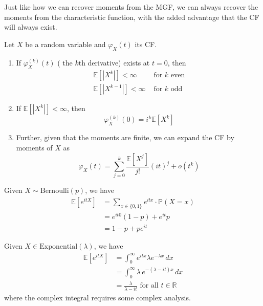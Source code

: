     Just like how we can recover moments from the MGF, we can always recover the moments from the characteristic function, with the added advantage that the CF will always exist. 

    \begin{theorem}
      Let $X$ be a random variable and $\varphi_X (t)$ its CF. 
      \begin{enumerate}
        \item If $\varphi_X^{(k)} (t)$ ( the $k$th derivative) exists at $t = 0$, then 
        \begin{align*}
          \mathbb{E}[|X^k|] < \infty & \text{ for } k \text{ even} \\
          \mathbb{E}[|X^{k-1}|] < \infty & \text{ for } k \text{ odd}
        \end{align*}
        
        \item If $\mathbb{E}[|X^k|] < \infty$, then 
        \begin{equation}
          \varphi_X^{(k)} (0) = i^k \mathbb{E}[X^k]
        \end{equation}
        
        \item Further, given that the moments are finite, we can expand the CF by moments of $X$ as 
        \begin{equation}
          \varphi_X (t) = \sum_{j=0}^k \frac{\mathbb{E}[X^j]}{j!} (i t)^j + o(t^k)
        \end{equation}
      \end{enumerate}
    \end{theorem}

    \begin{example}[Bernoulli]
      Given $X \sim \mathrm{Bernoulli}(p)$, we have 
      \begin{align*}
        \mathbb{E}[ e^{i t X}] & = \sum_{x \in \{0, 1\}} e^{i t x} \cdot \mathbb{P}(X = x) \\
        & = e^{i t 0} (1 - p) + e^{i t} p \\
        & = 1 - p + p e^{i t}
      \end{align*}
    \end{example}

    \begin{example}[Exponential]
      Given $X \in \mathrm{Exponential}(\lambda)$, we have 
      \begin{align*}
        \mathbb{E}[e^{i t X}] & = \int_0^\infty e^{i t x} \lambda e^{-\lambda x} \,dx \\
        & = \int_0^\infty \lambda \, e^{-(\lambda - i t) x} \,dx \\
        & = \frac{\lambda}{\lambda - it} \text{ for all } t \in \mathbb{R}
      \end{align*}
      where the complex integral requires some complex analysis. 
    \end{example}

